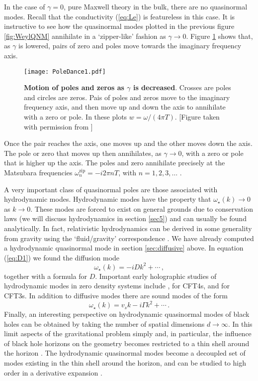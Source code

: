 \documentclass[10pt, oneside]{book}
\def\be{\begin{equation}}
\def\ee{\end{equation}}
\begin{document}
\begin{doublespace}
In the case of $\gamma = 0$, pure Maxwell theory in the bulk, there are no quasinormal modes. Recall that the conductivity (\ref{eq:Le}) is featureless in this case. It is instructive to see how the quasinormal modes plotted in the previous figure \ref{fig:WeylQNM} annihilate in a `zipper-like' fashion as $\gamma \to 0$. Figure \ref{fig:dance1} shows 
that, as $\gamma$ is lowered, pairs of zero and poles move towards the imaginary frequency axis. \begin{figure}[h]
\centering
\texttt{[image: PoleDance1.pdf]}
\caption{\label{fig:dance1} {\bf Motion of poles and zeros as $\gamma$ is decreased}. Crosses are poles and circles are zeros. Pais of poles and zeros move to the imaginary frequency axis, and then move up and down the axis to annihilate with a zero or pole. In these plots $w = \omega/(4 \pi T)$. [Figure taken with permission from \cite{WitczakKrempa:2012gn}]}
\end{figure}
Once the pair reaches the axis, one moves up and the other moves down the axis. The pole or zero that moves up then annihilates, as $\gamma \to 0$, with a zero or pole that is higher up the axis.
The poles and zero annihilate precisely at the Matsubara frequencies $\omega_n^\text{zip} = - i 2 \pi n T$, with $n=1,2,3, \ldots$ \cite{WitczakKrempa:2012gn}.

A very important class of quasinormal poles are those associated with hydrodynamic modes. Hydrodynamic modes have the property that $\omega_\star(k) \to 0$ as $k \to 0$. These modes are forced to exist on general grounds due to conservation laws (we will discuss hydrodynamics in section \ref{sec5}) and can usually be found analytically. In fact, relativistic hydrodynamics can be derived in some generality from gravity using the `fluid/gravity' correspondence \cite{Bhattacharyya:2008jc}. We have already computed a hydrodynamic quasinormal mode in section \ref{sec:diffusive} above. In equation (\ref{eq:D1}) we found the diffusion mode
\be
\omega_\star(k) =  - i D k^2 + \cdots \,,
\ee
together with a formula for $D$. Important early holographic studies of hydrodynamic modes in zero density systems include \cite{Policastro:2002se, Policastro:2002tn,Kovtun:2005ev}, for CFT4s, and \cite{Herzog:2002fn,Herzog:2003ke} for CFT3s. In addition to diffusive modes there are sound modes of the form
\be
\omega_\star(k) = v_s k - i \Gamma k^2 + \cdots \,.
\ee
Finally, an interesting perspective on hydrodynamic quasinormal modes of black holes can be obtained by taking the number of spatial dimensions $d \to \infty$. In this limit aspects of the gravitational problem simply and, in particular, the influence of black hole horizons on the geometry becomes restricted to a thin shell around the horizon \cite{Emparan:2013moa}. The hydrodynamic quasinormal modes become a decoupled set of modes existing in the thin shell around the horizon, and can be studied to high order in a derivative expansion \cite{Emparan:2015rva}.


\end{doublespace}
\end{document}
